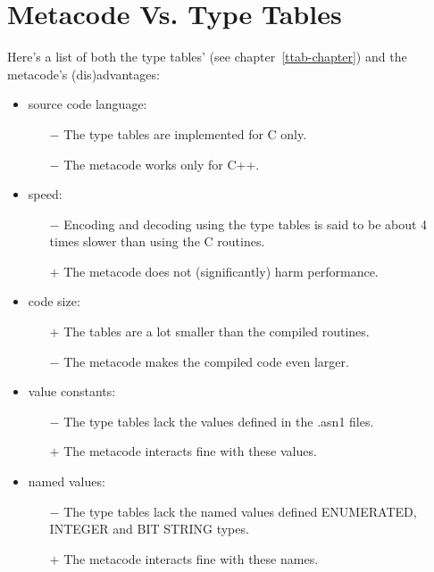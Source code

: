 \section{\label{meta-ttab-comparison}Metacode Vs. Type Tables}

Here's a list of both the type tables' (see chapter~\ref{ttab-chapter}) and the metacode's (dis)advantages:
\begin{itemize}

  \item source code language:
  \begin{itemize}
    \item[$-$] The type tables are implemented for C only.
    \item[$-$] The metacode works only for C++.
  \end{itemize}

  \item speed:
  \begin{itemize}
    \item[$-$] Encoding and decoding using the type tables is said to be about 4 times slower than using the C routines.
    \item[$+$] The metacode does not (significantly) harm performance.
  \end{itemize}

  \item code size:
  \begin{itemize}
    \item[$+$] The tables are a lot smaller than the compiled routines.
    \item[$-$] The metacode makes the compiled code even larger.
  \end{itemize}

  \item value constants:
  \begin{itemize}
    \item[$-$] The type tables lack the values defined in the {\ufn .asn1} files.
    \item[$+$] The metacode interacts fine with these values.
  \end{itemize}

  \item named values:
  \begin{itemize}
    \item[$-$] The type tables lack the named values defined ENUMERATED, INTEGER and BIT STRING types.
    \item[$+$] The metacode interacts fine with these names.
  \end{itemize}


\end{itemize}
